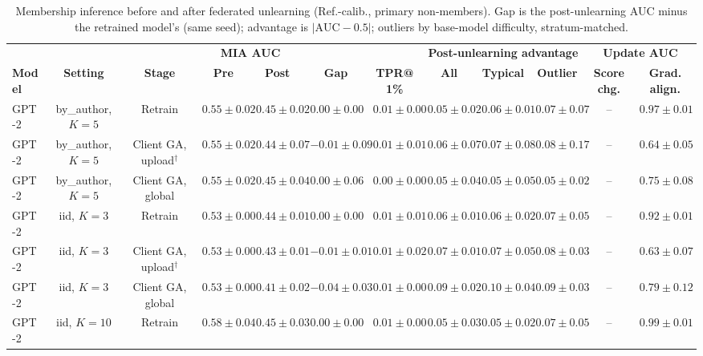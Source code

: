 \begin{table}[t]
\centering
\caption{Membership inference before and after federated unlearning (Ref.-calib., primary non-members). Gap is the post-unlearning AUC minus the retrained model's (same seed); advantage is $|\mathrm{AUC}-0.5|$; outliers by base-model difficulty, stratum-matched.}
\label{tab:federated-ref-calibrated-primary}
\footnotesize
\renewcommand{\arraystretch}{1.2}
\setlength{\tabcolsep}{2pt}
\begin{tabular*}{\textwidth}{@{\extracolsep{\fill}}lccccccccccc@{}}
\toprule
 & & & \multicolumn{2}{c}{\textbf{MIA AUC}} & & & \multicolumn{3}{c}{\textbf{Post-unlearning advantage}} & \multicolumn{2}{c}{\textbf{Update AUC}} \\
\cmidrule(lr){4-5}\cmidrule(lr){8-10}\cmidrule(lr){11-12}
\textbf{Model} & \textbf{Setting} & \textbf{Stage} & \textbf{Pre} & \textbf{Post} & \textbf{Gap} & \textbf{TPR@1\%} & \textbf{All} & \textbf{Typical} & \textbf{Outlier} & \textbf{Score chg.} & \textbf{Grad. align.} \\
\midrule
GPT-2 & by\_author, $K=5$ & Retrain & $0.55 \pm 0.02$ & $0.45 \pm 0.02$ & $0.00 \pm 0.00$ & $0.01 \pm 0.00$ & $0.05 \pm 0.02$ & $0.06 \pm 0.01$ & $0.07 \pm 0.07$ & -- & $0.97 \pm 0.01$ \\
GPT-2 & by\_author, $K=5$ & Client GA, upload$^{\dagger}$ & $0.55 \pm 0.02$ & $0.44 \pm 0.07$ & $-0.01 \pm 0.09$ & $0.01 \pm 0.01$ & $0.06 \pm 0.07$ & $0.07 \pm 0.08$ & $0.08 \pm 0.17$ & -- & $0.64 \pm 0.05$ \\
GPT-2 & by\_author, $K=5$ & Client GA, global & $0.55 \pm 0.02$ & $0.45 \pm 0.04$ & $0.00 \pm 0.06$ & $0.00 \pm 0.00$ & $0.05 \pm 0.04$ & $0.05 \pm 0.05$ & $0.05 \pm 0.02$ & -- & $0.75 \pm 0.08$ \\
GPT-2 & iid, $K=3$ & Retrain & $0.53 \pm 0.00$ & $0.44 \pm 0.01$ & $0.00 \pm 0.00$ & $0.01 \pm 0.01$ & $0.06 \pm 0.01$ & $0.06 \pm 0.02$ & $0.07 \pm 0.05$ & -- & $0.92 \pm 0.01$ \\
GPT-2 & iid, $K=3$ & Client GA, upload$^{\dagger}$ & $0.53 \pm 0.00$ & $0.43 \pm 0.01$ & $-0.01 \pm 0.01$ & $0.01 \pm 0.02$ & $0.07 \pm 0.01$ & $0.07 \pm 0.05$ & $0.08 \pm 0.03$ & -- & $0.63 \pm 0.07$ \\
GPT-2 & iid, $K=3$ & Client GA, global & $0.53 \pm 0.00$ & $0.41 \pm 0.02$ & $-0.04 \pm 0.03$ & $0.01 \pm 0.00$ & $0.09 \pm 0.02$ & $0.10 \pm 0.04$ & $0.09 \pm 0.03$ & -- & $0.79 \pm 0.12$ \\
GPT-2 & iid, $K=10$ & Retrain & $0.58 \pm 0.04$ & $0.45 \pm 0.03$ & $0.00 \pm 0.00$ & $0.01 \pm 0.00$ & $0.05 \pm 0.03$ & $0.05 \pm 0.02$ & $0.07 \pm 0.05$ & -- & $0.99 \pm 0.01$ \\

\end{tabular*}
\end{table}
